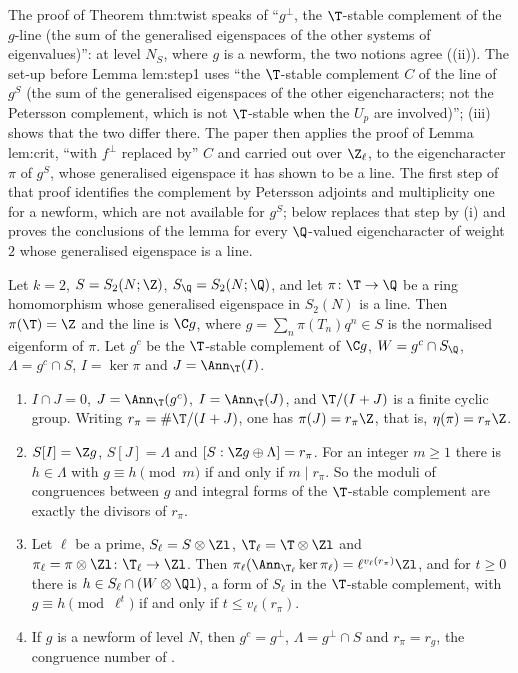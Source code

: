 \begin{paperlink}\label{pl:hecke:complements}
The proof of Theorem thm:twist speaks of ``$g^\perp$, the $\T$-stable complement of the $g$-line (the sum of the generalised eigenspaces of the other systems of eigenvalues)'': at level $N_S$,
where $g$ is a newform, the two notions agree ((ii)). The set-up before Lemma lem:step1 uses ``the $\T$-stable complement $C$ of the line of $g^S$ (the sum of the generalised eigenspaces of the other eigencharacters; not the
Petersson complement, which is not $\T$-stable when the $U_p$ are involved)''; (iii) shows that the two differ there. The paper then applies the proof of
Lemma lem:crit, ``with $f^\perp$ replaced by'' $C$ and carried out over $\Z_\ell$, to the eigencharacter $\pi$ of $g^S$, whose generalised eigenspace it has shown to be a line. The first step of
that proof identifies the complement by Petersson adjoints and multiplicity one for a newform, which are not available for $g^S$;  below replaces that step by
(i) and proves the conclusions of the lemma for every $\Q$-valued eigencharacter of weight $2$ whose generalised eigenspace is a line.
\end{paperlink}

\begin{proposition}\label{prop:hecke:congruence-module}
Let $k=2$, $S=S_2(N;\Z)$, $S_\Q=S_2(N;\Q)$, and let $\pi\colon\T\to\Q$ be a ring homomorphism whose generalised eigenspace in $S_2(N)$ is a line. Then $\pi(\T)=\Z$ and the line is
$\C g$, where $g=\sum_n\pi(T_n)q^n\in S$ is the normalised eigenform of $\pi$. Let $g^c$ be the $\T$-stable complement of $\C g$, $W=g^c\cap S_\Q$, $\Lambda=g^c\cap S$, $I=\ker\pi$ and $J=\Ann_\T(I)$.
\begin{enumerate}[label=(\roman*)]
\item $I\cap J=0$, $J=\Ann_\T(g^c)$, $I=\Ann_\T(J)$, and $\T/(I+J)$ is a finite cyclic group. Writing $r_\pi=\#\T/(I+J)$, one has $\pi(J)=r_\pi\Z$, that is, $\eta(\pi)=r_\pi\Z$.
\item $S[I]=\Z g$, $S[J]=\Lambda$ and $[S:\Z g\oplus\Lambda]=r_\pi$. For an integer $m\ge1$ there is $h\in\Lambda$ with $g\equiv h\pmod m$ if and only if $m\mid r_\pi$. So the moduli of congruences
between $g$ and integral forms of the $\T$-stable complement are exactly the divisors of $r_\pi$.
\item Let $\ell$ be a prime, $S_\ell=S\otimes\Zl$, $\T_\ell=\T\otimes\Zl$ and $\pi_\ell=\pi\otimes\Zl\colon\T_\ell\to\Zl$. Then $\pi_\ell(\Ann_{\T_\ell}\ker\pi_\ell)=\ell^{v_\ell(r_\pi)}\Zl$, and for $t\ge0$ there is
$h\in S_\ell\cap(W\otimes\Ql)$, a form of $S_\ell$ in the $\T$-stable complement, with $g\equiv h\pmod{\ell^t}$ if and only if $t\le v_\ell(r_\pi)$.
\item If $g$ is a newform of level $N$, then $g^c=g^\perp$, $\Lambda=g^\perp\cap S$ and $r_\pi=r_g$, the congruence number of .
\end{enumerate}
\end{proposition}

